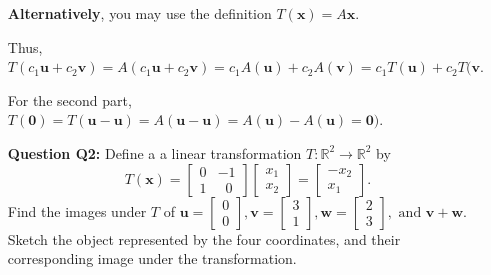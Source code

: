 \documentclass[a4paper,11pt,reqno]{amsart}
\numberwithin{equation}{section}
\begin{document}
\begin{enumerate}
\begin{center}
{{\vspace{0.2cm}
\textbf{Alternatively}, you may use the definition \( T(\mathbf{x}) = A\mathbf{x} \).

Thus, \( T(c_1\mathbf{u} + c_2\mathbf{v}) = A(c_1\mathbf{u} + c_2\mathbf{v}) = c_1A(\mathbf{u}) + c_2A(\mathbf{v}) = c_1T(\mathbf{u}) + c_2T(\mathbf{v}. \)

For the second part, 
\( T(\mathbf{0}) = T(\mathbf{u} - \mathbf{u}) = A(\mathbf{u} - \mathbf{u}) = A(\mathbf{u}) - A(\mathbf{u}) = \mathbf{0}). \)

}}
\end{center}



\item[\textbf{Question Q2:}]
 Define a a linear transformation \( T : \mathbb{R}^2 \to \mathbb{R}^2 \) by
    \[
    T(\mathbf{x})
    = 
    \begin{bmatrix}
        0 & -1\\
        1 &  \;\;0 
    \end{bmatrix} 
    \begin{bmatrix}
        x_1\\
        x_2
    \end{bmatrix}
    =
    \begin{bmatrix}
        -x_2\\
        x_1
    \end{bmatrix}.
    \]
    Find the images under \(T\) of 
    \(
    \mathbf{u}=
    \begin{bmatrix}
        0\\
        0
    \end{bmatrix},
    \mathbf{v}=
    \begin{bmatrix}
        3\\
        1
    \end{bmatrix},
    \mathbf{w}=
    \begin{bmatrix}
        2\\
        3
    \end{bmatrix}, \text{ and }
    \mathbf{v} + \mathbf{w}.
    \)
    Sketch the object represented by the four coordinates, and their corresponding image under the transformation.

\begin{center}\setlength{\fboxsep}{10pt}
\end{center}
\end{enumerate}
\end{document}
